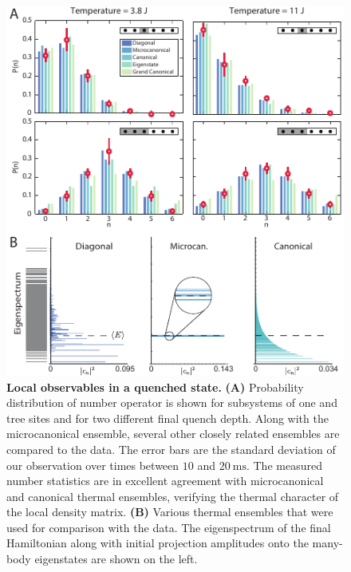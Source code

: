 \begin{figure}[t]
	\centering
	\includegraphics[scale=1.1]{figures/ETH_localDistr.pdf}
	\caption{{\bf Local observables in a quenched state. } {\bf (A)} Probability distribution of number operator is shown for subsystems of one and tree sites and for two different final quench depth. Along with the microcanonical ensemble, several other closely related ensembles are compared to the data. The error bars are the standard deviation of our observation over times between $10$ and $20~\mathrm{ms}$. The measured number statistics are in excellent agreement with microcanonical and canonical thermal ensembles, verifying the thermal character of the local density matrix. {\bf (B)} Various thermal ensembles that were used for comparison with the data. The eigenspectrum of the final Hamiltonian along with initial projection amplitudes onto the many-body eigenstates are shown on the left.}
	\label{fig:ETH_Ensembles}
\end{figure}

